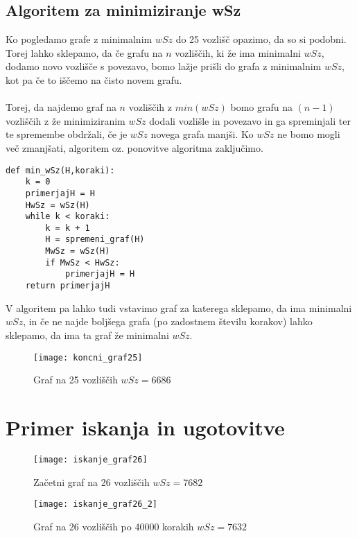 \documentclass[12pt, a4paper]{article}
\begin{document}
\newpage

\subsection[Algoritem za minimiziranje wSz]{Algoritem za minimiziranje wSz}

Ko pogledamo grafe z minimalnim $wSz$ do 25 vozlišč opazimo, da so si podobni. Torej lahko sklepamo, da če grafu na $n$ vozliščih, ki že ima minimalni $wSz$, dodamo novo vozlišče s povezavo, bomo lažje prišli do grafa z minimalnim $wSz$, kot pa če to iščemo na čisto novem grafu.\\
\\
Torej, da najdemo graf na $n$ vozliščih z $min(wSz)$ bomo grafu na $(n-1)$ vozliščih z že minimiziranim $wSz$ dodali vozlišle in povezavo in ga spreminjali ter te spremembe obdržali, če je $wSz$ novega grafa manjši. Ko $wSz$ ne bomo mogli več zmanjšati, algoritem oz. ponovitve algoritma zaključimo.

\begin{verbatim}
def min_wSz(H,koraki):
    k = 0
    primerjajH = H
    HwSz = wSz(H)
    while k < koraki:
        k = k + 1
        H = spremeni_graf(H)
        MwSz = wSz(H)
        if MwSz < HwSz:
            primerjajH = H
    return primerjajH
\end{verbatim}

V algoritem pa lahko tudi vstavimo graf za katerega sklepamo, da ima minimalni $wSz$, in če ne najde boljšega grafa (po zadostnem številu korakov)  lahko sklepamo, da ima ta graf že minimalni $wSz$.

\begin{figure}[h]
\centering
\texttt{[image: koncni\_graf25]}
\caption{Graf na 25 vozliščih $wSz = 6686$}
\end{figure}

\newpage
\section[Primer iskanja in ugotovitve]{Primer iskanja in ugotovitve}

\begin{figure}[h]
\centering
\texttt{[image: iskanje\_graf26]}
\caption{Začetni graf na 26 vozliščih $wSz = 7682$}
\end{figure}

\begin{figure}[h]
\centering
\texttt{[image: iskanje\_graf26\_2]}
\caption{Graf na 26 vozliščih po 40000 korakih $wSz = 7632$}
\end{figure}
\end{document}
